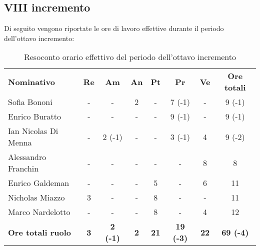 \documentclass[../piano-di-progetto.tex]{subfiles}
\begin{document}
\subsection{VIII incremento}

Di seguito vengono riportate le ore di lavoro effettive durante il periodo dell'ottavo incremento:
\begin{table}[H]
    \centering
    \begin{tabular}{lccccccc}
      \rowcolor{lightgray}
      \textbf{Nominativo}       & \textbf{Re}      & \textbf{Am} & \textbf{An}      & \textbf{Pt} & \textbf{Pr} & \textbf{Ve} & \textbf{Ore totali} \\
Sofia Bononi              & -          & -               & 2          & -           & 7 (-1)           & -           & 9 (-1)           \\
Enrico Buratto            & -          & -               & -          & -           & 9 (-1)           & -           & 9 (-1)           \\
Ian Nicolas Di Menna      & -          & 2 (-1)          & -          & -           & 3 (-1)           & 4           & 9 (-2)           \\
Alessandro Franchin       & -          & -               & -          & -           & -                & 8           & 8                \\
Enrico Galdeman           & -          & -               & -          & 5           & -                & 6           & 11               \\
Nicholas Miazzo           & 3          & -               & -          & 8           & -                & -           & 11               \\
Marco Nardelotto          & -          & -               & -          & 8           & -                & 4           & 12               \\
\textbf{Ore totali ruolo} & \textbf{3} & \textbf{2 (-1)} & \textbf{2} & \textbf{21} & \textbf{19 (-3)} & \textbf{22} & \textbf{69 (-4)}
    \end{tabular}
    \caption{Resoconto orario effettivo del periodo dell'ottavo incremento}
  \end{table}
\end{document}
